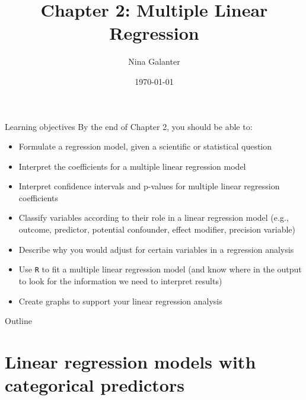\documentclass[10pt,t]{beamer}
\title{Chapter 2: Multiple Linear Regression}
\author{Nina Galanter}
\date{\today}
\begin{document}
	\begin{frame}
	\titlepage 
\end{frame}

\begin{frame}{Learning objectives}
By the end of Chapter 2, you should be able to:
\begin{itemize}
	\item Formulate a regression model, given a scientific or statistical question
	\item Interpret the coefficients for a multiple linear regression model
	\item Interpret confidence intervals and p-values for multiple linear regression coefficients
	\item Classify variables according to their role in a linear regression model (e.g., outcome, predictor, potential confounder, effect modifier, precision variable)
	\item Describe why you would adjust for certain variables in a regression analysis
	\item Use \texttt{R} to fit a multiple linear regression model (and know where in the output to look for the information we need to interpret results)
	\item Create graphs to support your linear regression analysis
\end{itemize}
\end{frame}


\begin{frame}{Outline}
\tableofcontents
\end{frame}





\section{Linear regression models with categorical predictors}
\end{document}
